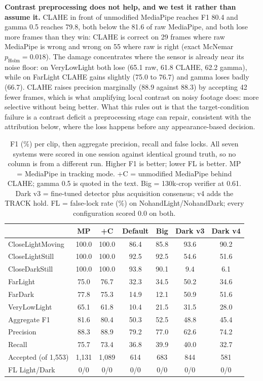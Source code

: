 \documentclass[conference,a4paper]{IEEEtran}
\begin{document}
\textbf{Contrast preprocessing does not help, and we test it rather than
assume it.} CLAHE in front of unmodified MediaPipe reaches F1 80.4 and
gamma 0.5 reaches 79.8, both below the 81.6 of raw MediaPipe, and both lose
more frames than they win: CLAHE is correct on 29 frames where raw
MediaPipe is wrong and wrong on 55 where raw is right (exact McNemar
$p_{\text{Holm}}=0.018$). The damage concentrates where the sensor is
already near its noise floor: on VeryLowLight both lose (65.1 raw, 61.8
CLAHE, 62.2 gamma), while on FarLight CLAHE gains slightly (75.0 to 76.7)
and gamma loses badly (66.7). CLAHE raises precision marginally (88.9
against 88.3) by accepting 42 fewer frames, which is what amplifying local
contrast on noisy footage does: more selective without being better. What
this rules out is that the target-condition failure is a contrast deficit
a preprocessing stage can repair, consistent with the attribution below,
where the loss happens before any appearance-based decision.

\begin{table}[t]
\caption{F1 (\%) per clip, then aggregate precision, recall and false
locks. All seven systems were scored in one session against identical
ground truth, so no column is from a different run. Higher F1 is better;
lower FL is better. MP = MediaPipe in tracking mode. +C = unmodified
MediaPipe behind CLAHE; gamma 0.5 is quoted in the text. Big = 130k-crop
verifier at 0.61. Dark v3 = fine-tuned detector plus acquisition
consensus; v4 adds the TRACK hold. FL = false-lock rate (\%) on
NohandLight/NohandDark; every configuration scored 0.0 on both.}
\label{tab:main}
\centering
\scriptsize
\setlength{\tabcolsep}{2.5pt}
\begin{tabular}{@{}lcccccc@{}}
\toprule
 & MP & +C & Default & Big & Dark v3 & Dark v4 \\
\midrule
CloseLightMoving & 100.0 & 100.0 & 86.4 & 85.8 & 93.6 & 90.2 \\
CloseLightStill & 100.0 & 100.0 & 92.5 & 92.5 & 54.6 & 51.6 \\
CloseDarkStill & 100.0 & 100.0 & 93.8 & 90.1 & 9.4 & 6.1 \\
FarLight & 75.0 & 76.7 & 32.3 & 34.5 & 50.2 & 34.6 \\
FarDark & 77.8 & 75.3 & 14.9 & 12.1 & 50.9 & 51.6 \\
VeryLowLight & 65.1 & 61.8 & 10.4 & 21.5 & 31.5 & 28.0 \\
\midrule
Aggregate F1 & 81.6 & 80.4 & 50.3 & 52.5 & 48.8 & 45.4 \\
Precision & 88.3 & 88.9 & 79.2 & 77.0 & 62.6 & 74.2 \\
Recall & 75.7 & 73.4 & 36.8 & 39.9 & 40.0 & 32.7 \\
Accepted (of 1,553) & 1,131 & 1,089 & 614 & 683 & 844 & 581 \\
FL Light/Dark & 0/0 & 0/0 & 0/0 & 0/0 & 0/0 & 0/0 \\
\bottomrule
\end{tabular}
\end{table}
\end{document}
